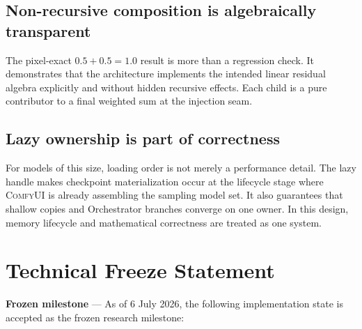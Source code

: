 \documentclass[11pt]{article}
\newcommand{\ComfyUI}{\textsc{ComfyUI}}
\newcommand{\freeze}{\textbf{Frozen milestone}}
\begin{document}
\subsection{Non-recursive composition is algebraically transparent}

The pixel-exact $0.5+0.5=1.0$ result is more than a regression check. It demonstrates that the architecture implements the intended linear residual algebra explicitly and without hidden recursive effects. Each child is a pure contributor to a final weighted sum at the injection seam.

\subsection{Lazy ownership is part of correctness}

For models of this size, loading order is not merely a performance detail. The lazy handle makes checkpoint materialization occur at the lifecycle stage where \ComfyUI{} is already assembling the sampling model set. It also guarantees that shallow copies and Orchestrator branches converge on one owner. In this design, memory lifecycle and mathematical correctness are treated as one system.

\section{Technical Freeze Statement}

\freeze{} --- As of 6 July 2026, the following implementation state is accepted as the frozen research milestone:
\end{document}

